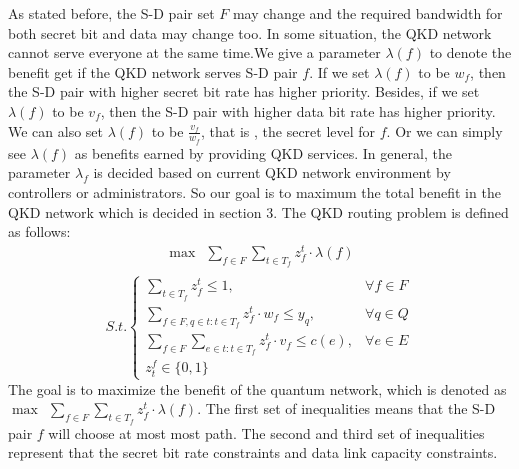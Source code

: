 As stated before, the S-D pair set $F$ may change and the required bandwidth for both secret bit and data may change too. In some situation, the QKD network cannot serve everyone at the same time.We give a parameter $\lambda(f)$ to denote the benefit get if the QKD network serves S-D pair $f$. If we set $\lambda(f)$ to be $w_f$, then the S-D pair with higher secret bit rate has higher priority. Besides, if we set $\lambda(f)$ to be $v_f$, then the S-D pair with higher data bit rate has higher priority. We can also set $\lambda(f)$ to be $\frac{v_f}{w_f}$, that is , the secret level for $f$. Or we can simply see $\lambda(f)$ as benefits earned by providing QKD services. In general, the parameter $\lambda_f$ is decided based on current QKD network environment by controllers or administrators. So our goal is to maximum the total benefit in the QKD network which is decided in section 3. The QKD routing problem is defined as follows:
	\begin{equation*}
    \begin{aligned}
    \max \ \ \sum_{f \in F}\sum_{t \in T_f}{z_f^t \cdot \lambda(f)} \\
    \end{aligned}
	\end{equation*}
	\begin{equation}\label{eq:profit}
	S.t.\begin{cases}
     \sum_{t \in T_f}{z_f^t} \le 1, & \forall f \in F \\
     \sum_{f \in F,q \in t:t \in T_f}{z_f^t \cdot w_f} \le  y_q, & \forall q \in Q \\
     \sum_{f \in F}\sum_{e \in t:t \in T_f}{z_f^t \cdot v_f} \le c(e), & \forall e \in E \\
     z^f_t \in \{0,1\}

	\end{cases}
	\end{equation}
The goal is to maximize the benefit of the quantum network, which is denoted as $\max \ \ \sum_{f \in F}\sum_{t \in T_f}{z_f^t \cdot \lambda(f)}$. The first set of inequalities means that the S-D pair $f$ will choose at most most path. The second and third set of inequalities represent that the secret bit rate constraints and data link capacity constraints.


